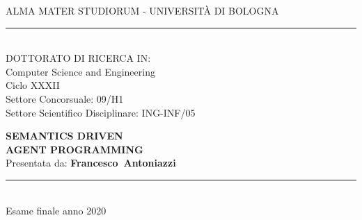 \begin{titlepage}
\begin{center}	%

\thispagestyle{empty}

{\small ALMA MATER STUDIORUM - UNIVERSIT\`A DI BOLOGNA}\\
\rule[0.1cm]{\textwidth}{0.6mm}\\

\vspace{10mm}
{\large DOTTORATO DI RICERCA IN:\\ Computer Science and Engineering \\ \vspace{15pt} Ciclo XXXII \\ \vspace{15pt} Settore Concorsuale: 09/H1\\ Settore Scientifico Disciplinare: ING-INF/05}

\vspace{20mm}
{\Large{\bf SEMANTICS DRIVEN}}\\
\vspace{3mm}
{\Large{\bf AGENT PROGRAMMING}}\\

\vspace{10mm} 
{\large Presentata da: \textbf{Francesco~Antoniazzi}}

\end{center}	%

\vspace{20mm}
\par
\noindent
\begin{minipage}[t]{0.47\textwidth}
\end{minipage}
\hfill
\begin{minipage}[t]{0.47\textwidth}\raggedleft
{}
\vspace{10mm}
\end{minipage}

\vfill
\begin{center}
\rule[0.1cm]{\textwidth}{0.6mm}\\
{\small Esame finale anno 2020}
\end{center}

\end{titlepage}